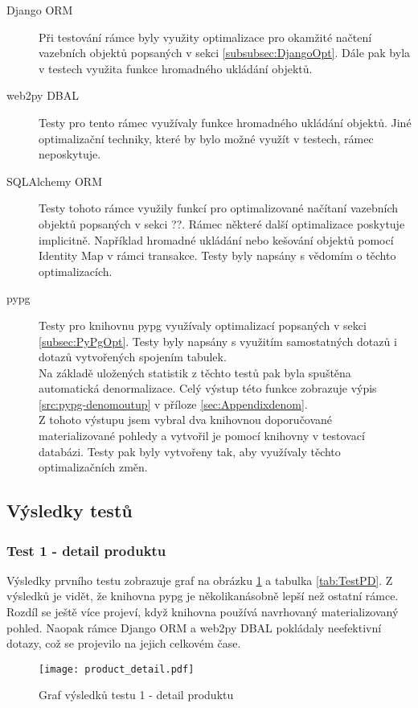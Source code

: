 \documentclass[ing,male,java,dept456]{diploma}						%
\begin{document}
\begin{description}
\item[Django ORM] Při testování rámce byly využity optimalizace pro okamžité načtení vazebních objektů popsaných v sekci \ref{subsubsec:DjangoOpt}. Dále pak byla v testech využita funkce hromadného ukládání objektů.
\item[web2py DBAL] Testy pro tento rámec využívaly funkce hromadného ukládání objektů. Jiné optimalizační techniky, které by bylo možné využít v testech, rámec neposkytuje.
\item[SQLAlchemy ORM] Testy tohoto rámce využily funkcí pro optimalizované načítaní vazebních objektů popsaných v sekci ??. Rámec některé další optimalizace poskytuje implicitně. Například hromadné ukládání nebo kešování objektů pomocí Identity Map v rámci transakce. Testy byly napsány s vědomím o těchto optimalizacích.
\item[pypg] Testy pro knihovnu pypg využívaly optimalizací popsaných v sekci \ref{subsec:PyPgOpt}. Testy byly napsány s využitím samostatných dotazů i dotazů vytvořených spojením tabulek. \\
Na základě uložených statistik z těchto testů pak byla spuštěna automatická denormalizace. Celý výstup této funkce zobrazuje výpis \ref{src:pypg-denomoutup} v příloze \ref{sec:Appendixdenom}. \\
Z tohoto výstupu jsem vybral dva knihovnou doporučované materializované pohledy a vytvořil je pomocí knihovny v testovací databázi. Testy pak byly vytvořeny tak, aby využívaly těchto optimalizačních změn.
\end{description}

\subsection{Výsledky testů}

\subsubsection{Test 1 - detail produktu}
Výsledky prvního testu zobrazuje graf na obrázku \ref{fig:TestPD} a tabulka \ref{tab:TestPD}. Z výsledků je vidět, že knihovna pypg je několikanásobně lepší než ostatní rámce. Rozdíl se ještě více projeví, když knihovna používá navrhovaný materializovaný pohled. Naopak rámce Django ORM a web2py DBAL pokládaly neefektivní dotazy, což se projevilo na jejich celkovém čase. 

\begin{figure}[h!]
    \centering
    \texttt{[image: product\_detail.pdf]}
    \caption{Graf výsledků testu 1 - detail produktu}
    \label{fig:TestPD}
\end{figure}
\end{document}
